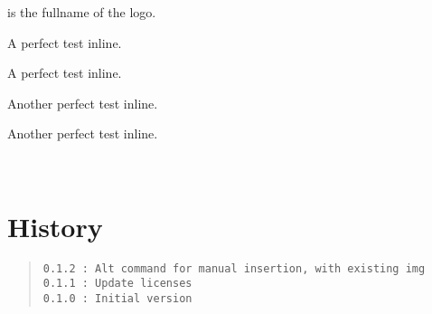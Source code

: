 \documentclass[11pt,a4paper]{ltxdoc}
\begin{document}
 is the fullname of the logo.

\begin{tcblisting}{}
{\Huge A perfect test  inline.}
\end{tcblisting}

\begin{tcblisting}{}
{\Huge A perfect test  inline.}
\end{tcblisting}

\begin{tcblisting}{}
{\LARGE Another perfect test  inline.}
\end{tcblisting}

\begin{tcblisting}{}
{\LARGE Another perfect test  inline.}
\end{tcblisting}

\vfill~

\section{History}

\begin{quote}
\begin{verbatim}
0.1.2 : Alt command for manual insertion, with existing img
0.1.1 : Update licenses
0.1.0 : Initial version
\end{verbatim}
\end{quote}
\end{document}
